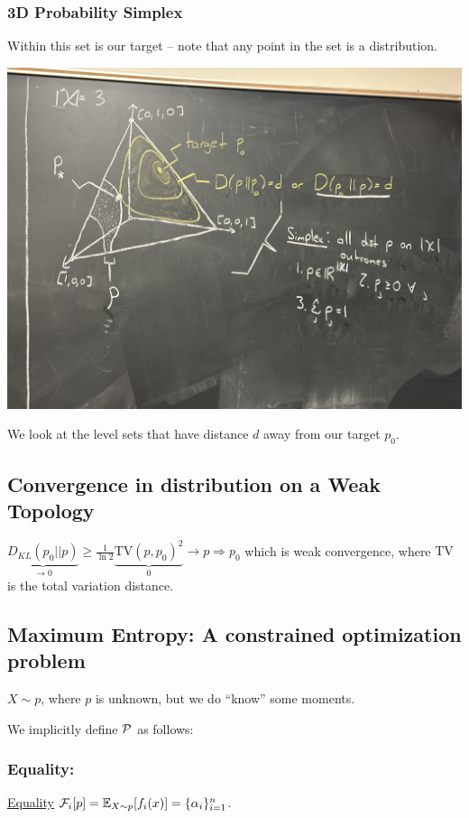 \subsubsection{3D Probability Simplex}
Within this set is our target -- note that any point in the set is a distribution. 

\begin{center}
    \includegraphics[scale=0.1]{lectures/wk8/img/img3.jpeg}
\end{center}

We look at the level sets that have distance $d$ away from our target $p_0$.

\subsection{Convergence in distribution on a Weak Topology}
$\underbrace{D_{KL}(p_0 || p)}_{\to0} \geq\frac1{\ln2} \underbrace{\text{TV}(p, p_0)^2}_{0} \to p \Rightarrow p_0$ which is weak convergence, 
where $\text{TV}$ is the total variation distance.

\subsection{Maximum Entropy: A constrained optimization problem}
$X\sim p$, where $p$ is unknown, but we do ``know'' some moments.

We implicitly define $\mathcal{P}$ as follows:
\subsubsection{Equality:}
\underline{Equality} $\mathcal{F}_i[p] = \mathbb{E}_{X\sim p}[f_i(x)]=\{\alpha_i\}_{i=1}^n$.

